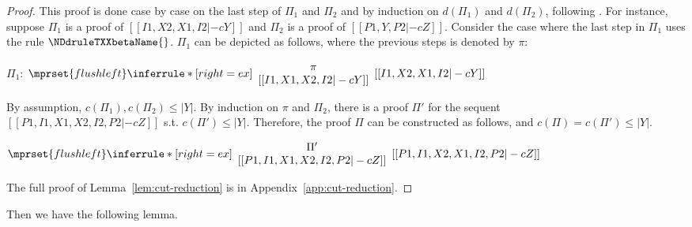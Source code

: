 \begin{proof}
  This proof is done case by case on the last step of $\Pi_1$ and
  $\Pi_2$ and by induction on $d(\Pi_1)$ and $d(\Pi_2)$, following
  \cite{Mellies:2009}. For instance, suppose $\Pi_1$ is a proof of
  $[[I1, X2, X1, I2 |-c Y]]$ and $\Pi_2$ is a proof of $[[P1, Y, P2
      |-c Z]]$.  Consider the case where the last step in $\Pi_1$ uses
  the rule $\NDdruleTXXbetaName{}$. $\Pi_1$ can be depicted as
  follows, where the previous steps is denoted by $\pi$:
  \begin{center}
    \scriptsize
    $\Pi_1$:
    \begin{math}
      $$\mprset{flushleft}
      \inferrule* [right={\tiny ex}] {
        {
          \begin{array}{c}
            \pi \\
                {[[I1, X1, X2, I2 |-c Y]]}
          \end{array}
        }
      }{[[I1, X2, X1, I2 |-c Y]]}
    \end{math}
  \end{center}
  By assumption, $c(\Pi_1),c(\Pi_2)\leq |Y|$. By induction on $\pi$ and
  $\Pi_2$, there is a proof $\Pi'$ for the sequent \\
  $[[P1, I1, X1, X2, I2, P2 |-c Z]]$ s.t. $c(\Pi')\leq|Y|$. Therefore, the
  proof $\Pi$ can be constructed as follows, and $c(\Pi)=c(\Pi')\leq|Y|$.
  \begin{center}
    \scriptsize
    \begin{math}
      $$\mprset{flushleft}
      \inferrule* [right={\tiny ex}] {
        {
          \begin{array}{c}
            \Pi' \\
                 {[[P1, I1, X1, X2, I2, P2 |-c Z]]}
          \end{array}
        }
      }{[[P1, I1, X2, X1, I2, P2 |-c Z]]}
    \end{math}
  \end{center}
  The full proof of Lemma~\ref{lem:cut-reduction} is in
  Appendix~\ref{app:cut-reduction}. 
\end{proof}
\noindent
Then we have the following lemma.

